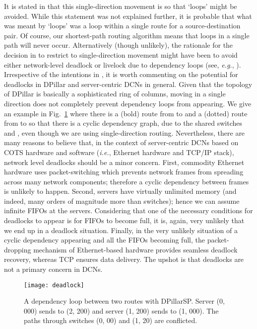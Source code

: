 \documentclass{article}
\newcounter{fig}
\begin{document}
It is stated in \cite[Section 3.1]{LYY12} that this single-direction movement is so that `loops' might be avoided. While this statement was not explained further, it is probable that what was meant by `loops' was a loop within a single route for a source-destination pair. Of course, our shortest-path routing algorithm means that loops in a single path will never occur. Alternatively (though unlikely), the rationale for the decision in \cite{LYY12} to restrict to single-direction movement might have been to avoid either network-level deadlock or livelock due to dependency loops (see, \emph{e.g.}, \cite[Ch. 14]{DT04}). Irrespective of the intentions in \cite{LYY12}, it is worth commenting on the potential for deadlocks in DPillar and server-centric DCNs in general. Given that the topology of DPillar is basically a sophisticated ring of columns, moving in a single direction does not completely prevent dependency loops from appearing. We give an example in Fig.~\ref{deadlock} where there is a (bold) route from  to  and a (dotted) route from  to  so that there is a cyclic dependency graph, due to the shared switches  and , even though we are using single-direction routing.  Nevertheless, there are many reasons to believe that, in the context of server-centric DCNs based on COTS hardware and software (\emph{i.e.}, Ethernet hardware and TCP/IP stack), network level deadlocks should be a minor concern. First, commodity Ethernet hardware uses packet-switching which prevents network frames from spreading across many network components; therefore a cyclic dependency between frames is unlikely to happen. Second, servers have virtually unlimited memory (and indeed, many orders of magnitude more than switches); hence we can assume infinite FIFOs at the servers. Considering that one of the necessary conditions for deadlocks to appear is for FIFOs to become full, it is, again, very unlikely that we end up in a deadlock situation. Finally, in the very unlikely situation of a cyclic dependency appearing and all the FIFOs becoming full, the packet-dropping mechanism of Ethernet-based hardware provides seamless deadlock recovery, whereas TCP ensures data delivery. The upshot is that deadlocks are not a primary concern in DCNs.

\begin{figure}[htb]
	\centering
		\texttt{[image: deadlock]}
	\caption{A dependency loop between two routes with DPillarSP. Server (0, 000) sends to (2, 200) and server (1, 200) sends to (1, 000). The paths through switches (0, 00) and (1, 20) are conflicted.}
	\label{deadlock}
\end{figure}
\end{document}
